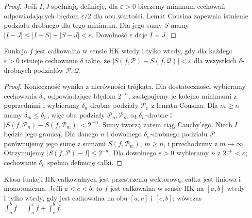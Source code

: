 \begin{proof}
Jeśli $I,J$ spełniają definicję, dla $\varepsilon>0$ bierzemy minimum cechowań odpowiadających błędom $\varepsilon/2$ dla obu wartości. Lemat Cousina zapewnia istnienie podziału drobnego dla tego minimum. Dla jego sumy $S$ mamy $|I-J|\le |I-S|+|S-J|<\varepsilon$. Dowolność $\varepsilon$ daje $I=J$.
\end{proof}
\begin{twierdzenie}\label{ma1:kh:thm:kh-cauchy}\label{it:thm:kh-cauchy}
Funkcja $f$ jest całkowalna w sensie HK wtedy i tylko wtedy, gdy dla każdego $\varepsilon>0$ istnieje cechowanie $\delta$ takie, że $|S(f,\mathcal P)-S(f,\mathcal Q)|<\varepsilon$ dla wszystkich $\delta$-drobnych podziałów $\mathcal P,\mathcal Q$.
\end{twierdzenie}
\begin{proof}
Konieczność wynika z nierówności trójkąta. Dla dostateczności wybieramy cechowania $\delta_n$ odpowiadające błędom $2^{-n}$, zastępujemy je kolejno minimami z poprzednimi i wybieramy $\delta_n$-drobne podziały $\mathcal P_n$ z lematu Cousina. Dla $m\ge n$ mamy $\delta_m\le\delta_n$, więc oba podziały $\mathcal P_n,\mathcal P_m$ są $\delta_n$-drobne i $|S(f,\mathcal P_n)-S(f,\mathcal P_m)|<2^{-n}$. Sumy tworzą zatem ciąg Cauchy'ego. Niech $I$ będzie jego granicą. Dla danego $n$ i dowolnego $\delta_n$-drobnego podziału $\mathcal P$ porównujemy jego sumę z sumami $S(f,\mathcal P_m)$, $m\ge n$, i przechodzimy z $m\to\infty$. Otrzymujemy $|S(f,\mathcal P)-I|\le2^{-n}$. Dla dowolnego $\varepsilon>0$ wybieramy $n$ z $2^{-n}<\varepsilon$; cechowanie $\delta_n$ spełnia definicję całki.
\end{proof}
\begin{twierdzenie}\label{ma1:kh:thm:kh-locality}\label{it:thm:kh-locality}
Klasa funkcji HK-całkowalnych jest przestrzenią wektorową, całka jest liniowa i monotoniczna. Jeśli $a<c<b$, to $f$ jest całkowalna w sensie HK na $[a,b]$ wtedy i tylko wtedy, gdy jest całkowalna na obu $[a,c]$ i $[c,b]$; wówczas $\int_a^b f=\int_a^c f+\int_c^b f$.
\end{twierdzenie}
